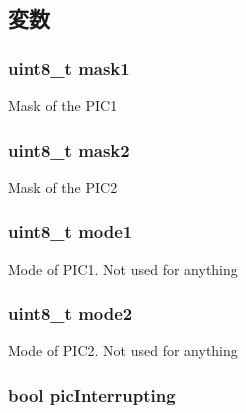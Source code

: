 \subsection{変数}
\hypertarget{classTsunamiIO_adaf4809f6b77e7cde58780f5f451a6e4}{
\subsubsection[{mask1}]{\setlength{\rightskip}{0pt plus 5cm}uint8\_\-t {\bf mask1}}}
\label{classTsunamiIO_adaf4809f6b77e7cde58780f5f451a6e4}
Mask of the PIC1 \hypertarget{classTsunamiIO_a474e49c245ff8b6dc57653a9cd7f64dc}{
\subsubsection[{mask2}]{\setlength{\rightskip}{0pt plus 5cm}uint8\_\-t {\bf mask2}}}
\label{classTsunamiIO_a474e49c245ff8b6dc57653a9cd7f64dc}
Mask of the PIC2 \hypertarget{classTsunamiIO_a9237c26b42f96e5e4ad44839abdf85ce}{
\subsubsection[{mode1}]{\setlength{\rightskip}{0pt plus 5cm}uint8\_\-t {\bf mode1}}}
\label{classTsunamiIO_a9237c26b42f96e5e4ad44839abdf85ce}
Mode of PIC1. Not used for anything \hypertarget{classTsunamiIO_af51e3a81fa6352c9fbc24d5bc03d843f}{
\subsubsection[{mode2}]{\setlength{\rightskip}{0pt plus 5cm}uint8\_\-t {\bf mode2}}}
\label{classTsunamiIO_af51e3a81fa6352c9fbc24d5bc03d843f}
Mode of PIC2. Not used for anything \hypertarget{classTsunamiIO_ab72d9ca48cf8b7b897799490833c4b5e}{
\subsubsection[{picInterrupting}]{\setlength{\rightskip}{0pt plus 5cm}bool {\bf picInterrupting}}}
